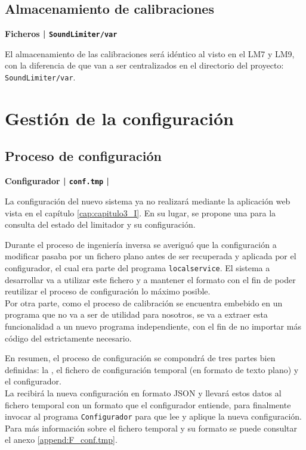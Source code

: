 \subsection{Almacenamiento de calibraciones}

\begin{flushright}
\textbf{Ficheros | \texttt{SoundLimiter/var}}
\end{flushright}

El almacenamiento de las calibraciones será idéntico al visto en el \acrshort{LM7} y \acrshort{LM9}, con la diferencia de que van a ser centralizados en el directorio del proyecto:\\ \texttt{SoundLimiter/var}.

\section{Gestión de la configuración}

\subsection{Proceso de configuración}

\begin{flushright}
\textbf{Configurador | \texttt{conf.tmp} | }
\end{flushright}

La configuración del nuevo sistema ya no realizará mediante la aplicación web vista en el capítulo \ref{cap:capitulo3_I}. En su lugar, se propone una  para la consulta del estado del limitador y su configuración.

Durante el proceso de ingeniería inversa se averiguó que la configuración a modificar pasaba por un fichero plano antes de ser recuperada y aplicada por el configurador, el cual era parte del programa \texttt{localservice}. El sistema a desarrollar va a utilizar este fichero y a mantener el formato con el fin de poder reutilizar el proceso de configuración lo máximo posible.\\
Por otra parte, como el proceso de calibración se encuentra embebido en un programa que no va a ser de utilidad para nosotros, se va a extraer esta funcionalidad a un nuevo programa independiente, con el fin de no importar más código del estrictamente necesario.

En resumen, el proceso de configuración se compondrá de tres partes bien definidas: la , el fichero de configuración temporal (en formato de texto plano) y el configurador.\\
La  recibirá la nueva configuración en formato \acrshort{JSON} y llevará estos datos al fichero temporal con un formato que el configurador entiende, para finalmente invocar al programa \texttt{Configurador} para que lee y aplique la nueva configuración. Para más información sobre el fichero temporal y su formato se puede consultar el anexo \ref{append:F_conf.tmp}.

